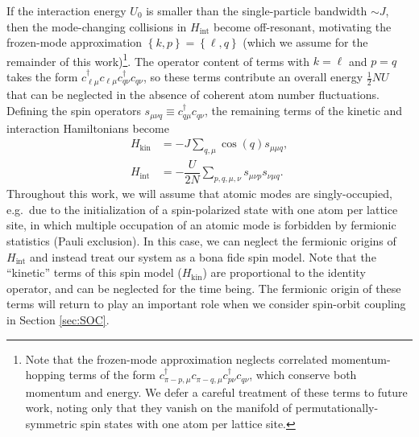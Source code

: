 \documentclass[nofootinbib,twocolumn]{revtex4-2}
\renewcommand{\t}{\text} %
\newcommand{\f}[2]{\dfrac{#1}{#2}} %
\newcommand{\p}[1]{\left(#1\right)} %
\renewcommand{\set}[1]{\left\{#1\right\}} %
\newcommand{\1}{\mathds{1}}
\begin{document}
If the interaction energy $U_0$ is smaller than the single-particle bandwidth $\sim J$, then the mode-changing collisions in $H_{\t{int}}$ become off-resonant, motivating the frozen-mode approximation $\set{k,p}=\set{\ell,q}$ (which we assume for the remainder of this work)\footnote{Note that the frozen-mode approximation neglects correlated momentum-hopping terms of the form $c_{\pi-p,\mu}^\dag c_{\pi-q,\mu} c_{p\nu}^\dag c_{q\nu}$, which conserve both momentum and energy.
We defer a careful treatment of these terms to future work, noting only that they vanish on the manifold of permutationally-symmetric spin states with one atom per lattice site.}.
The operator content of terms with $k=\ell$ and $p=q$ takes the form $c_{\ell\mu}^\dag c_{\ell\mu} c_{q\nu}^\dag c_{q\nu}$, so these terms contribute an overall energy $\frac12NU$ that can be neglected in the absence of coherent atom number fluctuations.
Defining the spin operators $s_{\mu\nu q}\equiv c_{q\mu}^\dag c_{q\nu}$, the remaining terms of the kinetic and interaction Hamiltonians become
\begin{align}
  H_{\t{kin}} &= -J\sum_{q,\mu} \cos\p{q} s_{\mu\mu q},
  \label{H_kin_start} \\
  H_{\t{int}} &= -\f{U}{2N} \sum_{p,q,\mu,\nu} s_{\mu\nu p} s_{\nu\mu q}.
  \label{eq:H_int_start}
\end{align}
Throughout this work, we will assume that atomic modes are singly-occupied, e.g.~due to the initialization of a spin-polarized state with one atom per lattice site, in which multiple occupation of an atomic mode is forbidden by fermionic statistics (Pauli exclusion).
In this case, we can neglect the fermionic origins of $H_{\t{int}}$ and instead treat our system as a bona fide spin model.
Note that the ``kinetic'' terms of this spin model ($H_{\t{kin}}$) are proportional to the identity operator, and can be neglected for the time being.
The fermionic origin of these terms will return to play an important role when we consider spin-orbit coupling in Section \ref{sec:SOC}.
\end{document}
